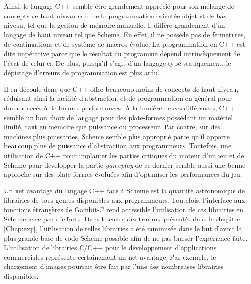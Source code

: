 \documentclass[12pt,twoside,letterpaper,francais]{book}
\begin{document}
Ainsi, le langage C++ semble être grandement apprécié pour son mélange
de concepts de haut niveau comme la programmation orientée objet et de
bas niveau, tel que la gestion de mémoire manuelle. Il diffère
grandement d'un langage de haut niveau tel que Scheme. En effet,
il ne possède pas de fermetures, de continuations et de système de
macros évolué. La programmation en C++ est dite impérative parce que
le résultat du programme dépend intrinsèquement de l'état de
celui-ci. De plus, puisqu'il s'agit d'un langage typé statiquement, le
dépistage d'erreurs de programmation est plus ardu.

Il en découle donc que C++ offre beaucoup moins de concepts de haut
niveau, réduisant ainsi la facilité d'abstraction et de programmation
en général pour donner accès à de bonnes performances. À la lumière de
ces différences, C++ semble un bon choix de langage pour des
plate-formes possédant un matériel limité, tant en mémoire que
puissance du processeur. Par contre, sur des machines plus puissantes,
Scheme semble plus approprié parce qu'il apporte beaucoup plus de
puissance d'abstraction aux programmeurs. Toutefois, une utilisation
de C++ pour implanter les parties critiques du moteur d'un jeu et de
Scheme pour développer la partie \textit{gameplay} de ce dernier
semble aussi une bonne approche sur des plate-formes évoluées afin
d'optimiser les performances du jeu.

Un net avantage du langage C++ face à Scheme est la quantité
astronomique de librairies de tous genres disponibles aux
programmeurs. Toutefois, l'interface aux fonctions étrangères de
Gambit-C rend accessible l'utilisation de ces librairies en Scheme
avec peu d'efforts. Dans le cadre des travaux présentés dans le
chapitre \ref{Chap:exp}, l'utilisation de telles librairies a été
minimisée dans le but d'avoir la plus grande base de code Scheme
possible afin de ne pas biaiser l'expérience faite. L'utilisation de
librairies C/C++ pour le dévelop\-pement d'applications commerciales
représente certainement un net avantage. Par exemple, le chargement
d'images pourrait être fait par l'une des nombreuses librairies
disponibles.
\end{document}
